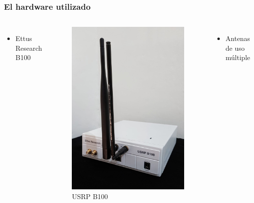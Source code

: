 \begin{frame}
\frametitle{El hardware utilizado}
\begin{columns}
		\begin{itemize}	
			\item {Ettus Research B100}
		\end{itemize}
		\begin{figure}
		\includegraphics[scale=0.10]{usrp_foto}
		\caption{USRP B100}
		\end{figure}
		\begin{itemize}	
			\item { Antenas de uso múltiple}

\end{itemize}
\end{columns}
\end{frame}
